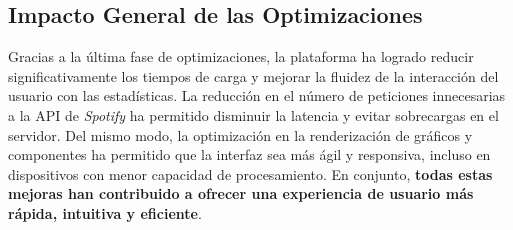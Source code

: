 \subsection{Impacto General de las Optimizaciones}

Gracias a la última fase de optimizaciones, la plataforma ha logrado reducir significativamente los tiempos de carga y mejorar la fluidez de la interacción del usuario con las estadísticas. La reducción en el número de peticiones innecesarias a la API de \textit{Spotify} ha permitido disminuir la latencia y evitar sobrecargas en el servidor. Del mismo modo, la optimización en la renderización de gráficos y componentes ha permitido que la interfaz sea más ágil y responsiva, incluso en dispositivos con menor capacidad de procesamiento. En conjunto, \textbf{todas estas mejoras han contribuido a ofrecer una experiencia de usuario más rápida, intuitiva y eficiente}.
